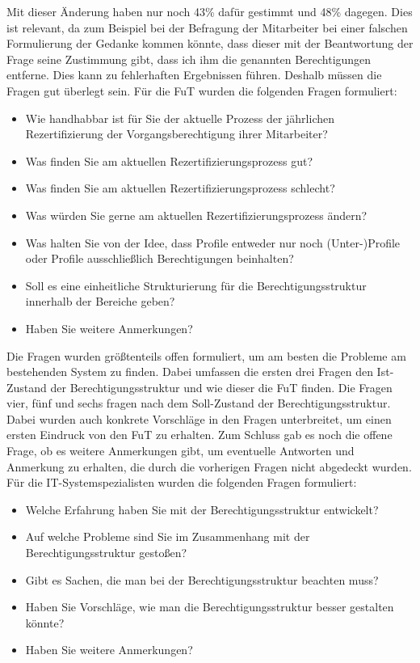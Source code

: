 Mit dieser Änderung haben nur noch 43\% dafür gestimmt und 48\% dagegen. \cite{Survey}
\newline
Dies ist relevant, da zum Beispiel bei der Befragung der Mitarbeiter bei einer falschen Formulierung der Gedanke kommen könnte, dass dieser mit der Beantwortung der Frage seine Zustimmung gibt, dass ich ihm die genannten Berechtigungen entferne.
Dies kann zu fehlerhaften Ergebnissen führen.
Deshalb müssen die Fragen gut überlegt sein.
\newline
\newline
Für die \ac{FuT} wurden die folgenden Fragen formuliert: 
\begin{itemize}
	\item Wie handhabbar ist für Sie der aktuelle Prozess der jährlichen Rezertifizierung der Vorgangsberechtigung ihrer Mitarbeiter?
	\item Was finden Sie am aktuellen Rezertifizierungsprozess gut?
	\item Was finden Sie am aktuellen Rezertifizierungsprozess schlecht?
	\item Was würden Sie gerne am aktuellen Rezertifizierungsprozess ändern?
	\item Was halten Sie von der Idee, dass Profile entweder nur noch (Unter-)Profile oder Profile ausschließlich Berechtigungen beinhalten?
	\item Soll es eine einheitliche Strukturierung für die Berechtigungsstruktur innerhalb der Bereiche geben?
	\item Haben Sie weitere Anmerkungen?
\end{itemize}
Die Fragen wurden größtenteils offen formuliert, um am besten die Probleme am bestehenden System zu finden.
Dabei umfassen die ersten drei Fragen den Ist-Zustand der Berechtigungsstruktur und wie dieser die \ac{FuT} finden.
Die Fragen vier, fünf und sechs fragen nach dem Soll-Zustand der Berechtigungsstruktur.
Dabei wurden auch konkrete Vorschläge in den Fragen unterbreitet, um einen ersten Eindruck von den \ac{FuT} zu erhalten.
Zum Schluss gab es noch die offene Frage, ob es weitere Anmerkungen gibt, um eventuelle Antworten und Anmerkung zu erhalten, die durch die vorherigen Fragen nicht abgedeckt wurden.
\newline
\newline
Für die IT-Systemspezialisten wurden die folgenden Fragen formuliert: 
\begin{itemize}
	\item Welche Erfahrung haben Sie mit der Berechtigungsstruktur entwickelt?
	\item Auf welche Probleme sind Sie im Zusammenhang mit der Berechtigungsstruktur gestoßen?
	\item Gibt es Sachen, die man bei der Berechtigungsstruktur beachten muss?
	\item Haben Sie Vorschläge, wie man die Berechtigungsstruktur besser gestalten könnte?
	\item Haben Sie weitere Anmerkungen?
\end{itemize}
